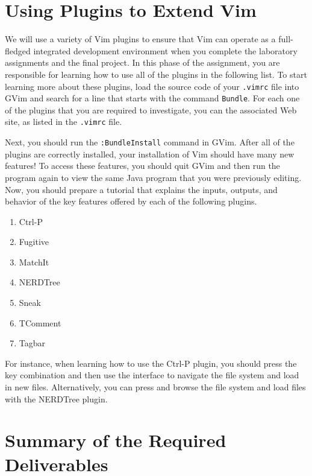 \section*{Using Plugins to Extend Vim}

We will use a variety of Vim plugins to ensure that Vim can operate as a full-fledged integrated development environment
when you complete the laboratory assignments and the final project.  In this phase of the assignment, you are
responsible for learning how to use all of the plugins in the following list.  To start learning more about these plugins, load
the source code of your {\tt .vimrc} file into GVim and search for a line that starts with the command {\tt Bundle}.  For
each one of the plugins that you are required to investigate, you can the associated Web site, as listed in the {\tt .vimrc} file. 

Next, you should run the {\tt :BundleInstall} command in GVim.  After all of the plugins are correctly installed, your
installation of Vim should have many new features! To access these features, you should quit GVim and then run the program again
to view the same Java program that you were previously editing.  Now, you should prepare a tutorial that explains the inputs,
outputs, and behavior of the key features offered by each of the following plugins.

\begin{enumerate}

  \item Ctrl-P 
  \item Fugitive
  \item MatchIt
  \item NERDTree
  \item Sneak
  \item TComment
  \item Tagbar

\end{enumerate}

For instance, when learning how to use the Ctrl-P plugin, you should press the key combination {\tt <ctrl-p>} and then use the
interface to navigate the file system and load in new files.  Alternatively, you can press {\tt <F11>} and browse the file system
and load files with the NERDTree plugin.

\section*{Summary of the Required Deliverables}


